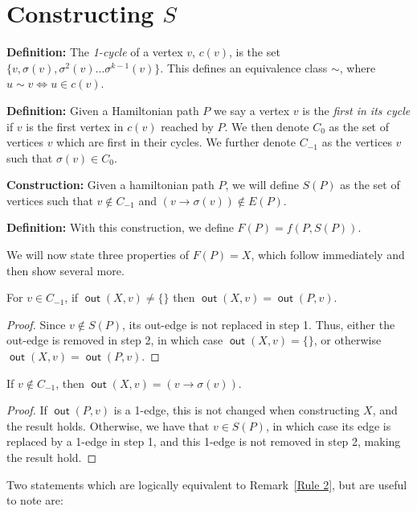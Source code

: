 \documentclass{article}
\DeclareMathOperator{\out}{\bm{\mathsf{out}}}
\newcommand{\dc}[1]{}%
\begin{document}
\section{Constructing \texorpdfstring{$S$}{S} } \label{construction}

\dc{amsthm}
\textbf{Definition:} The \textit{1-cycle} of a vertex $v$, $c(v)$, is the set $\{v,\sigma(v),\sigma^2(v)\dots \sigma^{k-1}(v)\}$. This defines an equivalence class $\sim$, where $u \sim v \iff u \in c(v)$.

\textbf{Definition:} Given a Hamiltonian path $P$ we say a vertex $v$ is the \textit{first in its cycle} if $v$ is the first vertex in $c(v)$ reached by $P$. We then denote $C_0$ as the set of vertices $v$ which are first in their cycles. We further denote $C_{-1}$ as the vertices $v$ such that $\sigma(v) \in C_0$.

\vspace{1.75em}

\dc{amsthm}
\textbf{Construction:} Given a hamiltonian path $P$, we will define $S(P)$ as the set of vertices such that $v \not \in C_{-1}$ and $(v \to \sigma(v)) \not \in E(P)$. 

\textbf{Definition:} With this construction, we define $F(P) = f(P,S(P))$.

\vspace{1.75em}

We will now state three properties of $F(P) = X$, which follow immediately and then show several more.\dc{ These properties will allow us to...}

\vspace{1.75em}

\begin{rmk} \label{Rule 1} For $v \in C_{-1}$, if $\out(X,v) \neq \{\}$ then $\out(X,v) = \out(P,v)$.\dc{ use ``tail''}
\begin{proof}
Since $v \not\in S(P)$, its out-edge is not replaced in step 1. Thus, either the out-edge is removed in step 2, in which case $\out(X,v) = \{\}$, or otherwise $\out(X,v) =\out(P,v)$.
\end{proof}
\end{rmk}

\begin{rmk} \label{Rule 2} If $v \not \in C_{-1}$, then $\out(X,v) = (v \to \sigma(v))$.  

\begin{proof} 
If $\out(P,v)$ is a 1-edge, this is not changed when constructing $X$, and the result holds. Otherwise, we have that $v \in S(P)$, in which case its edge is replaced by a 1-edge in step 1, and this 1-edge is not removed in step 2, making the result hold.
\end{proof}
\end{rmk}
Two statements which are logically equivalent to Remark~\ref{Rule 2}, but are useful to note are:
\end{document}
